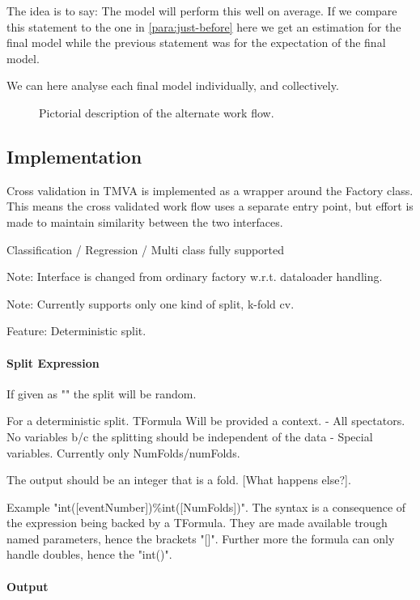 The idea is to say: The model will perform this well on average. If we compare this statement to the one in \ref{para:just-before} here we get an estimation for the final model while the previous statement was for the expectation of the final model.

We can here analyse each final model individually, and collectively.

\begin{center}
\begin{figure}
   \missingfigure{}
   \label{fig:workflow1}
   \caption{Pictorial description of the alternate work flow.}
\end{figure}
\end{center}

\subsection{Implementation}
Cross validation in TMVA is implemented as a wrapper around the Factory class. This means the cross validated work flow uses a separate entry point, but effort is made to maintain similarity between the two interfaces.

Classification / Regression / Multi class fully supported

Note: Interface is changed from ordinary factory w.r.t. dataloader handling.

Note: Currently supports only one kind of split, k-fold cv.

Feature: Deterministic split.
\paragraph{Split Expression}
If given as "" the split will be random.

For a deterministic split.
TFormula
Will be provided a context.
 - All spectators. No variables b/c the splitting should be independent of the data
 - Special variables. Currently only NumFolds/numFolds.

The output should be an integer that is a fold. [What happens else?].

Example "int([eventNumber])\%int([NumFolds])". The syntax is a consequence of the expression being backed by a TFormula. They are made available trough named parameters, hence the brackets "[]". Further more the formula can only handle doubles, hence the "int()".

\paragraph{Output}

